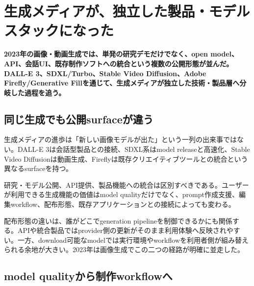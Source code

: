 \section{生成メディアが、独立した製品・モデルスタックになった}
\noindent\textbf{2023年の画像・動画生成では、単発の研究デモだけでなく、open model、API、会話UI、既存制作ソフトへの統合という複数の公開形態が並んだ。DALL-E 3、SDXL/Turbo、Stable Video Diffusion、Adobe Firefly/Generative Fillを通じて、生成メディアが独立した技術・製品層へ分岐した過程を追う。}\autocite{src-091bbe9dbf4e,src-096341c0ccf6,src-0b410c70bfc7,src-18f22707bf78,src-2b694ab9a461,src-2c97fc5583a3,src-317afaba6510,src-9bc8e7751f80,src-9da0d929aa45,src-a4f61fbe35c5,src-ba80e5e27a11,src-e79065444906}

\subsection{同じ生成でも公開surfaceが違う}

生成メディアの進歩は「新しい画像モデルが出た」という一列の出来事ではない。DALL-E 3は会話型製品との接続、SDXL系はmodel releaseと高速化、Stable Video Diffusionは動画生成、Fireflyは既存クリエイティブツールとの統合という異なるsurfaceを持つ。\autocite{src-091bbe9dbf4e,src-096341c0ccf6,src-0b410c70bfc7,src-18f22707bf78,src-2b694ab9a461,src-2c97fc5583a3,src-317afaba6510,src-9bc8e7751f80,src-9da0d929aa45,src-a4f61fbe35c5,src-ba80e5e27a11,src-e79065444906}


研究・モデル公開、API提供、製品機能への統合は区別すべきである。ユーザーが利用できる生成機能の価値はmodel qualityだけでなく、prompt作成支援、編集workflow、配布形態、既存アプリケーションとの接続によっても変わる。\autocite{src-091bbe9dbf4e,src-18f22707bf78,src-2b694ab9a461,src-317afaba6510,src-9bc8e7751f80,src-9da0d929aa45,src-a4f61fbe35c5,src-ba80e5e27a11,src-e79065444906}


配布形態の違いは、誰がどこでgeneration pipelineを制御できるかにも関係する。APIや統合製品ではprovider側の更新がそのまま利用体験へ反映されやすい。一方、download可能なmodelでは実行環境やworkflowを利用者側が組み替えられる余地が大きい。2023年は画像生成でこの二つの経路が明確に並走した。\autocite{src-091bbe9dbf4e,src-18f22707bf78,src-2b694ab9a461,src-317afaba6510,src-9bc8e7751f80,src-9da0d929aa45,src-a4f61fbe35c5,src-ba80e5e27a11,src-e79065444906}


\subsection{model qualityから制作workflowへ}

